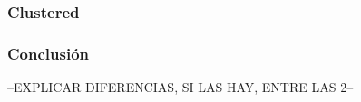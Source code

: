 \subsubsection{Clustered}
			
	
			
			


\subsubsection{Conclusión}

--EXPLICAR DIFERENCIAS, SI LAS HAY, ENTRE LAS 2--